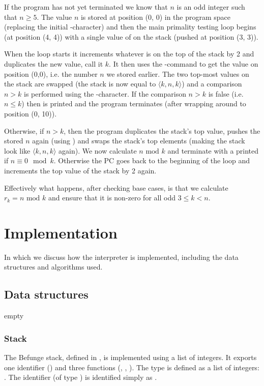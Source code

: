 \documentclass[12pt, a4paper]{article}
\begin{document}
If the program has not yet terminated we know that $n$ is an odd integer such that $n \geq 5$. The value $n$ is stored at position (0, 0) in the program space (replacing the initial \code{\&}-character) and then the main primality testing loop begins (at position (4, 4)) with a single value of  on the stack (pushed at position (3, 3)).

When the loop starts it increments whatever is on the top of the stack by 2 and duplicates the new value, call it $k$. It then uses the -command to get the value on position (0,0), i.e. the number $n$ we stored earlier. The two top-most values on the stack are swapped (the stack is now equal to $\langle k, n, k \rangle$) and a comparison $n > k$ is performed using the \code{\`{}}-character. If the comparison $n > k$ is false (i.e. $n \leq k$) then  is printed and the program terminates (after wrapping around to position (0, 10)).

Otherwise, if $n > k$, then the program duplicates the stack's top value, pushes the stored $n$ again (using ) and swaps the stack's top elements (making the stack look like $\langle k, n, k \rangle$ again). We now calculate $n \text{ mod } k$ and terminate with a printed  if $n \equiv 0 \mod k$. Otherwise the PC goes back to the beginning of the loop and increments the top value of the stack by 2 again.

Effectively what happens, after checking base cases, is that we calculate $r_k = n \text{ mod } k$ and ensure that it is non-zero for all odd $3 \leq k < n$.

\section{Implementation}
\label{sec:impl}

In which we discuss how the interpreter is implemented, including the data structures and algorithms used.

\subsection{Data structures}
\label{sec:structures}

empty

\subsubsection{Stack}
\label{sec:structstack}

The Befunge stack, defined in , is implemented using a list of integers. It exports one identifier () and three functions (, , ). The type  is defined as a list of integers: . The identifier  (of type ) is identified simply as .
\end{document}

